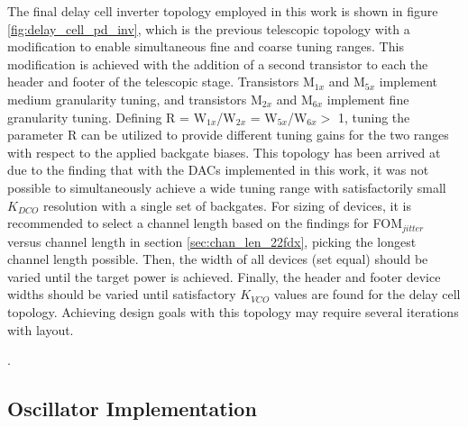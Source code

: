 	The final delay cell inverter topology employed in this work is shown in figure \ref{fig:delay_cell_pd_inv}, which is the previous telescopic topology with a modification to enable simultaneous fine and coarse tuning ranges. This modification is achieved with the addition of a second transistor to each the header and footer of the telescopic stage. Transistors M$_{1x}$ and M$_{5x}$ implement medium granularity tuning, and transistors M$_{2x}$ and M$_{6x}$ implement fine granularity tuning. Defining R = W$_{1x}$/W$_{2x}$ = W$_{5x}$/W$_{6x} >$ 1, tuning the parameter R can be utilized to provide different tuning gains for the two ranges with respect to the applied backgate biases. This topology has been arrived at due to the finding that with the DACs implemented in this work, it was not possible to simultaneously achieve a wide tuning range with satisfactorily small $K_{DCO}$ resolution with a single set of backgates. For sizing of devices, it is recommended to select a channel length based on the findings for FOM$_{jitter}$ versus channel length in section \ref{sec:chan_len_22fdx}, picking the longest channel length possible. Then, the width of all devices (set equal) should be varied until the target power is achieved. Finally, the header and footer device widths should be varied until satisfactory $K_{VCO}$ values are found for the delay cell topology. Achieving design goals with this topology may require several iterations with layout.

	{\color{white}.}\FloatBarrier
	\vspace{-1em}
	\subsection{Oscillator Implementation}
